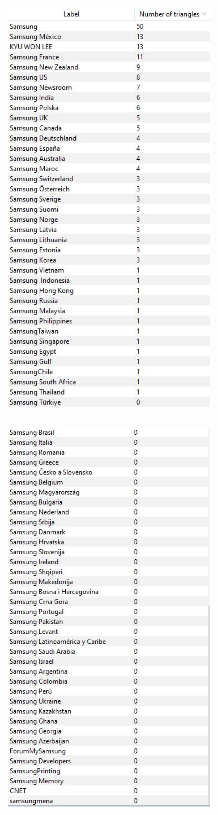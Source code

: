 \documentclass[12pt]{article}
\begin{document}
	\begin{center}
		\begin{adjustbox}{valign=t}
			\includegraphics[width=0.4\textwidth]{photos-files/section8/num_of_triangles_1.JPG}
		\end{adjustbox}
		\hfill
		\begin{adjustbox}{valign=t}
			\includegraphics[width=0.4\textwidth]{photos-files/section8/num_of_triangles_2.JPG}
		\end{adjustbox}
	\end{center}
	
	\newpage
\end{document}
